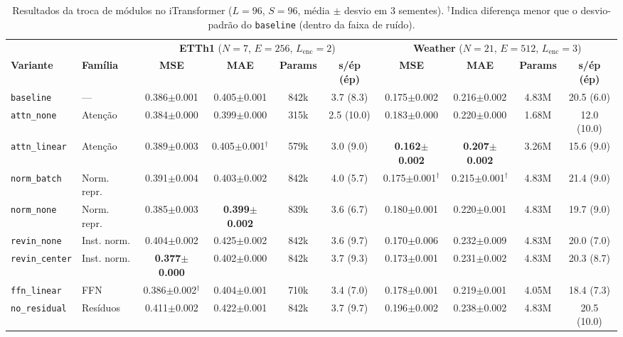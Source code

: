 \begin{table}[t]
\centering
\caption{Resultados da troca de módulos no iTransformer ($L=96$, $S=96$, média $\pm$ desvio em 3 sementes). $^\dagger$Indica diferença menor que o desvio-padrão do \texttt{baseline} (dentro da faixa de ruído).}
\label{tab:resultados}
\scriptsize
\setlength{\tabcolsep}{3.2pt}
\begin{tabular}{llcccccccc}
\toprule
 & & \multicolumn{4}{c}{\textbf{ETTh1} ($N=7$, $E=256$, $L_{\text{enc}}=2$)} & \multicolumn{4}{c}{\textbf{Weather} ($N=21$, $E=512$, $L_{\text{enc}}=3$)} \\
\cmidrule(lr){3-6}\cmidrule(lr){7-10}
\textbf{Variante} & \textbf{Família} & \textbf{MSE} & \textbf{MAE} & \textbf{Params} & \textbf{s/ép (ép)} & \textbf{MSE} & \textbf{MAE} & \textbf{Params} & \textbf{s/ép (ép)} \\
\midrule
\texttt{baseline} & --- & 0.386$\pm$0.001 & 0.405$\pm$0.001 & 842k & 3.7 (8.3) & 0.175$\pm$0.002 & 0.216$\pm$0.002 & 4.83M & 20.5 (6.0) \\
\texttt{attn\_none} & Atenção & 0.384$\pm$0.000 & 0.399$\pm$0.000 & 315k & 2.5 (10.0) & 0.183$\pm$0.000 & 0.220$\pm$0.000 & 1.68M & 12.0 (10.0) \\
\texttt{attn\_linear} & Atenção & 0.389$\pm$0.003 & 0.405$\pm$0.001$^\dagger$ & 579k & 3.0 (9.0) & \textbf{0.162$\pm$0.002} & \textbf{0.207$\pm$0.002} & 3.26M & 15.6 (9.0) \\
\texttt{norm\_batch} & Norm. repr. & 0.391$\pm$0.004 & 0.403$\pm$0.002 & 842k & 4.0 (5.7) & 0.175$\pm$0.001$^\dagger$ & 0.215$\pm$0.001$^\dagger$ & 4.83M & 21.4 (9.0) \\
\texttt{norm\_none} & Norm. repr. & 0.385$\pm$0.003 & \textbf{0.399$\pm$0.002} & 839k & 3.6 (6.7) & 0.180$\pm$0.001 & 0.220$\pm$0.001 & 4.83M & 19.7 (9.0) \\
\texttt{revin\_none} & Inst. norm. & 0.404$\pm$0.002 & 0.425$\pm$0.002 & 842k & 3.6 (9.7) & 0.170$\pm$0.006 & 0.232$\pm$0.009 & 4.83M & 20.0 (7.0) \\
\texttt{revin\_center} & Inst. norm. & \textbf{0.377$\pm$0.000} & 0.402$\pm$0.000 & 842k & 3.7 (9.3) & 0.173$\pm$0.001 & 0.231$\pm$0.002 & 4.83M & 20.3 (8.7) \\
\texttt{ffn\_linear} & FFN & 0.386$\pm$0.002$^\dagger$ & 0.404$\pm$0.001 & 710k & 3.4 (7.0) & 0.178$\pm$0.001 & 0.219$\pm$0.001 & 4.05M & 18.4 (7.3) \\
\texttt{no\_residual} & Resíduos & 0.411$\pm$0.002 & 0.422$\pm$0.001 & 842k & 3.7 (9.7) & 0.196$\pm$0.002 & 0.238$\pm$0.002 & 4.83M & 20.5 (10.0) \\
\bottomrule
\end{tabular}
\vspace{-4pt}
\end{table}
